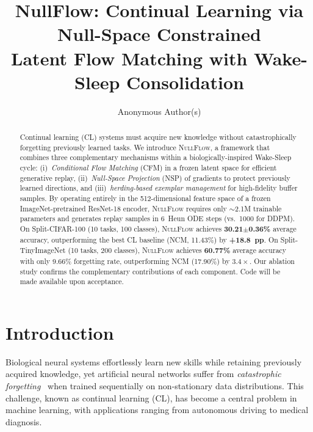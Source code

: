 \documentclass[10pt,twocolumn,letterpaper]{article}
\title{NullFlow: Continual Learning via Null-Space Constrained\\Latent Flow Matching with Wake-Sleep Consolidation}
\author{Anonymous Author(s)}
\date{}
\newcommand{\ours}{\textsc{NullFlow}}
\begin{document}
\maketitle

\begin{abstract}
Continual learning (CL) systems must acquire new knowledge without catastrophically forgetting previously learned tasks. We introduce \ours{}, a framework that combines three complementary mechanisms within a biologically-inspired Wake-Sleep cycle: (i)~\textit{Conditional Flow Matching} (CFM) in a frozen latent space for efficient generative replay, (ii)~\textit{Null-Space Projection} (NSP) of gradients to protect previously learned directions, and (iii)~\textit{herding-based exemplar management} for high-fidelity buffer samples. By operating entirely in the 512-dimensional feature space of a frozen ImageNet-pretrained ResNet-18 encoder, \ours{} requires only $\sim$2.1M trainable parameters and generates replay samples in 6~Heun ODE steps (vs.\ 1000 for DDPM). On Split-CIFAR-100 (10 tasks, 100 classes), \ours{} achieves \textbf{30.21$\pm$0.36\%} average accuracy, outperforming the best CL baseline (NCM, 11.43\%) by \textbf{+18.8~pp}. On Split-TinyImageNet (10 tasks, 200 classes), \ours{} achieves \textbf{60.77\%} average accuracy with only 9.66\% forgetting rate, outperforming NCM (17.90\%) by $3.4\times$. Our ablation study confirms the complementary contributions of each component. Code will be made available upon acceptance.
\end{abstract}

\section{Introduction}
\label{sec:intro}

Biological neural systems effortlessly learn new skills while retaining previously acquired knowledge, yet artificial neural networks suffer from \textit{catastrophic forgetting}~\cite{mccloskey1989catastrophic,french1999catastrophic} when trained sequentially on non-stationary data distributions. This challenge, known as continual learning (CL), has become a central problem in machine learning, with applications ranging from autonomous driving to medical diagnosis.
\end{document}
